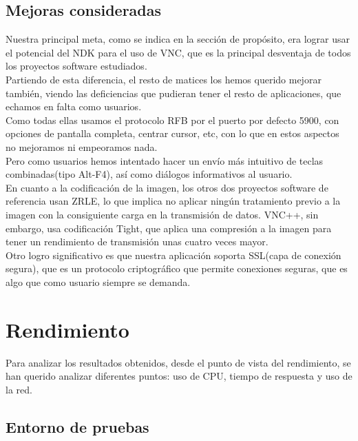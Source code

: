 \subsection{Mejoras consideradas}

Nuestra principal meta, como se indica en la sección de propósito, era lograr usar el potencial del NDK para el uso de VNC, que es la principal desventaja de todos los proyectos software estudiados.\\

Partiendo de esta diferencia, el resto de matices los hemos querido mejorar también, viendo las deficiencias que pudieran tener el resto de aplicaciones, que echamos en falta como usuarios.\\

Como todas ellas usamos el protocolo RFB por el puerto por defecto 5900, con opciones de pantalla completa, centrar cursor, etc, con lo que en estos aspectos no mejoramos ni empeoramos nada.\\

Pero como usuarios hemos intentado hacer un envío más intuitivo de teclas combinadas(tipo Alt-F4), así como diálogos informativos al usuario.\\

En cuanto a la codificación de la imagen, los otros dos proyectos software de referencia usan ZRLE, lo que implica no aplicar ningún tratamiento previo a la imagen con la consiguiente carga en la transmisión de datos. VNC++, sin embargo, usa codificación Tight, que aplica una compresión a la imagen para tener un rendimiento de transmisión unas cuatro veces mayor.\\

Otro logro significativo es que nuestra aplicación soporta SSL(capa de conexión segura), que es un protocolo criptográfico que permite conexiones seguras, que es algo que como usuario siempre se demanda.\\

\section{Rendimiento}

Para analizar los resultados obtenidos, desde el punto de vista del rendimiento, se han querido analizar diferentes puntos: uso de CPU, tiempo de respuesta y uso de la red.

\subsection{Entorno de pruebas}

